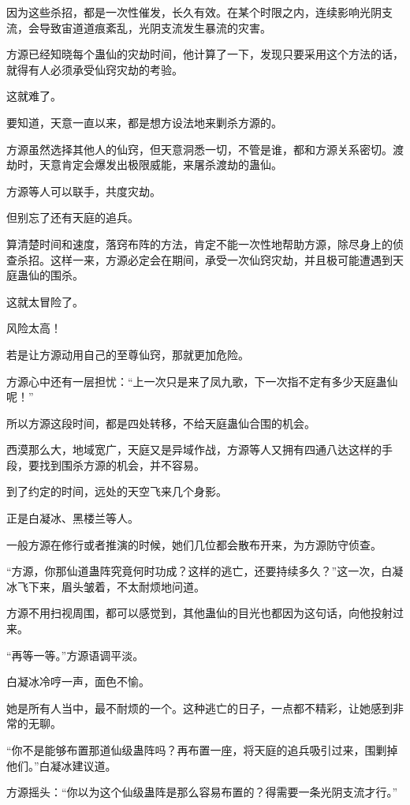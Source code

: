 \begin{this_body}
因为这些杀招，都是一次性催发，长久有效。在某个时限之内，连续影响光阴支流，会导致宙道道痕紊乱，光阴支流发生暴流的灾害。

方源已经知晓每个蛊仙的灾劫时间，他计算了一下，发现只要采用这个方法的话，就得有人必须承受仙窍灾劫的考验。

这就难了。

要知道，天意一直以来，都是想方设法地来剿杀方源的。

方源虽然选择其他人的仙窍，但天意洞悉一切，不管是谁，都和方源关系密切。渡劫时，天意肯定会爆发出极限威能，来屠杀渡劫的蛊仙。

方源等人可以联手，共度灾劫。

但别忘了还有天庭的追兵。

算清楚时间和速度，落窍布阵的方法，肯定不能一次性地帮助方源，除尽身上的侦查杀招。这样一来，方源必定会在期间，承受一次仙窍灾劫，并且极可能遭遇到天庭蛊仙的围杀。

这就太冒险了。

风险太高！

若是让方源动用自己的至尊仙窍，那就更加危险。

方源心中还有一层担忧：“上一次只是来了凤九歌，下一次指不定有多少天庭蛊仙呢！”

所以方源这段时间，都是四处转移，不给天庭蛊仙合围的机会。

西漠那么大，地域宽广，天庭又是异域作战，方源等人又拥有四通八达这样的手段，要找到围杀方源的机会，并不容易。

到了约定的时间，远处的天空飞来几个身影。

正是白凝冰、黑楼兰等人。

一般方源在修行或者推演的时候，她们几位都会散布开来，为方源防守侦查。

“方源，你那仙道蛊阵究竟何时功成？这样的逃亡，还要持续多久？”这一次，白凝冰飞下来，眉头皱着，不太耐烦地问道。

方源不用扫视周围，都可以感觉到，其他蛊仙的目光也都因为这句话，向他投射过来。

“再等一等。”方源语调平淡。

白凝冰冷哼一声，面色不愉。

她是所有人当中，最不耐烦的一个。这种逃亡的日子，一点都不精彩，让她感到非常的无聊。

“你不是能够布置那道仙级蛊阵吗？再布置一座，将天庭的追兵吸引过来，围剿掉他们。”白凝冰建议道。

方源摇头：“你以为这个仙级蛊阵是那么容易布置的？得需要一条光阴支流才行。”


\end{this_body}
